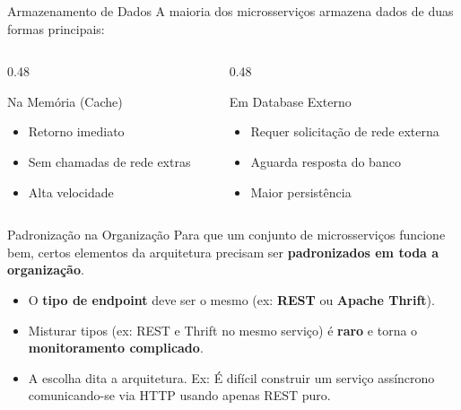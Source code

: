 \documentclass[aspectratio=169]{beamer}
\begin{document}
\begin{frame}{Armazenamento de Dados}
    A maioria dos microsserviços armazena dados de duas formas principais:
    \vspace{0.4cm}
    \begin{columns}
        \begin{column}{0.48\textwidth}
            \begin{block}{Na Memória (Cache)}
                \begin{itemize}
                    \item Retorno imediato
                    \item Sem chamadas de rede extras
                    \item Alta velocidade
                \end{itemize}
            \end{block}
        \end{column}
        \begin{column}{0.48\textwidth}
            \begin{block}{Em Database Externo}
                \begin{itemize}
                    \item Requer solicitação de rede externa
                    \item Aguarda resposta do banco
                    \item Maior persistência
                \end{itemize}
            \end{block}
        \end{column}
    \end{columns}
\end{frame}

\begin{frame}{Padronização na Organização}
    Para que um conjunto de microsserviços funcione bem, certos elementos da arquitetura precisam ser \textbf{padronizados em toda a organização}.
    \vspace{0.3cm}
    \begin{itemize}
        \item O \textbf{tipo de endpoint} deve ser o mesmo (ex: \textbf{REST} ou \textbf{Apache Thrift}).
        \item Misturar tipos (ex: REST e Thrift no mesmo serviço) é \textbf{raro} e torna o \textbf{monitoramento complicado}.
        \item A escolha dita a arquitetura. Ex: É difícil construir um serviço assíncrono comunicando-se via HTTP usando apenas REST puro.
    \end{itemize}
\end{frame}
\end{document}
